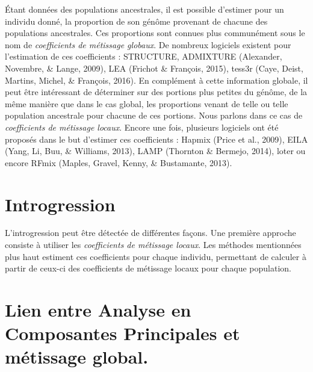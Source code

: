 \documentclass[12pt,twoside]{ugathesis}
\begin{document}
  Étant données des populations ancestrales, il est possible d'estimer
  pour un individu donné, la proportion de son génôme provenant de chacune
  des populations ancestrales. Ces proportions sont connues plus
  communément sous le nom de \emph{coefficients de métissage globaux}. De
  nombreux logiciels existent pour l'estimation de ces coefficients :
  STRUCTURE, ADMIXTURE (Alexander, Novembre, \& Lange, 2009), LEA (Frichot
  \& François, 2015), tess3r (Caye, Deist, Martins, Michel, \& François,
  2016). En complément à cette information globale, il peut être
  intéressant de déterminer sur des portions plus petites du génôme, de la
  même manière que dans le cas global, les proportions venant de telle ou
  telle population ancestrale pour chacune de ces portions. Nous parlons
  dans ce cas de \emph{coefficients de métissage locaux}. Encore une fois,
  plusieurs logiciels ont été proposés dans le but d'estimer ces
  coefficients : Hapmix (Price et al., 2009), EILA (Yang, Li, Buu, \&
  Williams, 2013), LAMP (Thornton \& Bermejo, 2014), loter ou encore RFmix
  (Maples, Gravel, Kenny, \& Bustamante, 2013).
  
  \section{Introgression}\label{introgression}
  
  L'introgression peut être détectée de différentes façons. Une première
  approche consiste à utiliser les \emph{coefficients de métissage
  locaux}. Les méthodes mentionnées plus haut estiment ces coefficients
  pour chaque individu, permettant de calculer à partir de ceux-ci des
  coefficients de métissage locaux pour chaque population.
  
  \section{Lien entre Analyse en Composantes Principales et métissage
  global.}\label{lien-entre-analyse-en-composantes-principales-et-metissage-global.}
  
\end{document}
